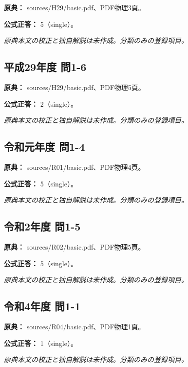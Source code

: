\noindent\textbf{原典：} sources/H29/basic.pdf、PDF物理3頁。

\textbf{公式正答：} 5（single）。

\par\textit{原典本文の校正と独自解説は未作成。分類のみの登録項目。}

\subsection{平成29年度 問1-6}
\label{q:h29-reg-basic-1-6}

\noindent\textbf{原典：} sources/H29/basic.pdf、PDF物理5頁。

\textbf{公式正答：} 2（single）。

\par\textit{原典本文の校正と独自解説は未作成。分類のみの登録項目。}

\subsection{令和元年度 問1-4}
\label{q:r01-reg-basic-1-4}

\noindent\textbf{原典：} sources/R01/basic.pdf、PDF物理4頁。

\textbf{公式正答：} 5（single）。

\par\textit{原典本文の校正と独自解説は未作成。分類のみの登録項目。}

\subsection{令和2年度 問1-5}
\label{q:r02-reg-basic-1-5}

\noindent\textbf{原典：} sources/R02/basic.pdf、PDF物理5頁。

\textbf{公式正答：} 5（single）。

\par\textit{原典本文の校正と独自解説は未作成。分類のみの登録項目。}

\subsection{令和4年度 問1-1}
\label{q:r04-reg-basic-1-1}

\noindent\textbf{原典：} sources/R04/basic.pdf、PDF物理1頁。

\textbf{公式正答：} 1（single）。

\par\textit{原典本文の校正と独自解説は未作成。分類のみの登録項目。}


